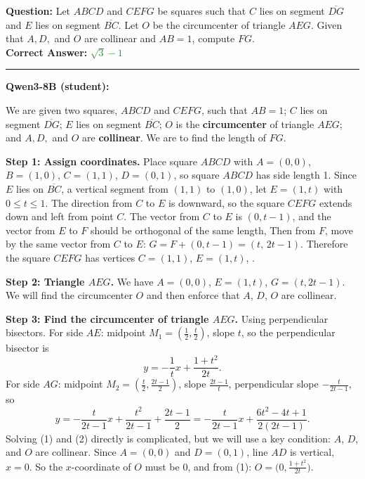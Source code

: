 \bigskip

\begin{ReasoningBox}[title={Case Study: Math Reasoning (Smaller \& Larger Setting)}, breakable]
\textbf{Question:} Let $ABCD$ and $CEFG$ be squares such that $C$ lies on segment $\overline{DG}$ and $E$ lies on segment $\overline{BC}$. Let $O$ be the circumcenter of triangle $AEG$. Given that $A, D,$ and $O$ are collinear and $AB = 1$, compute $FG$.\\
\textbf{Correct Answer:} \textcolor{forestgreen}{$\sqrt{3}-1$}

\medskip
\noindent\rule{\linewidth}{0.4pt}
\medskip

\textbf{Qwen3-8B (student):}

We are given two squares, $ABCD$ and $CEFG$, such that $AB = 1$; $C$ lies on segment $\overline{DG}$; $E$ lies on segment $\overline{BC}$; $O$ is the \textbf{circumcenter} of triangle $AEG$; and $A, D,$ and $O$ are \textbf{collinear}. We are to find the length of $FG$.

\textbf{Step 1: Assign coordinates.} Place square $ABCD$ with $A = (0,0)$, $B = (1,0)$, $C = (1,1)$, $D = (0,1)$, so square $ABCD$ has side length 1. Since $E$ lies on $\overline{BC}$, a vertical segment from $(1,1)$ to $(1,0)$, let $E = (1, t)$ with $0 \le t \le 1$. The direction from $C$ to $E$ is downward, so the square $CEFG$ extends down and left from point $C$. The vector from $C$ to $E$ is $(0, t-1)$, and the vector from $E$ to $F$ should be orthogonal of the same length,  Then from $F$, move by the same vector from $C$ to $E$: $G = F + (0, t-1) = (t,\, 2t-1)$. Therefore the square $CEFG$ has vertices $C = (1,1)$, $E = (1,t)$, .

\textbf{Step 2: Triangle $AEG$.} We have $A = (0,0)$, $E = (1,t)$, $G = (t, 2t-1)$. We will find the circumcenter $O$ and then enforce that $A$, $D$, $O$ are collinear.

\textbf{Step 3: Find the circumcenter of triangle $AEG$.} Using perpendicular bisectors. For side $AE$: midpoint $M_1 = (\tfrac12, \tfrac t2)$, slope $t$, so the perpendicular bisector is
\[
y = -\frac{1}{t}x + \frac{1 + t^2}{2t}. \tag{1}
\]
For side $AG$: midpoint $M_2 = (\tfrac t2, \tfrac{2t-1}{2})$, slope $\tfrac{2t-1}{t}$, perpendicular slope $-\tfrac{t}{2t-1}$, so
\[
y = -\frac{t}{2t-1}x + \frac{t^2}{2t-1} + \frac{2t-1}{2} = -\frac{t}{2t-1}x + \frac{6t^2 - 4t + 1}{2(2t-1)}. \tag{2}
\]
Solving (1) and (2) directly is complicated, but we will use a key condition: $A$, $D$, and $O$ are collinear. Since $A = (0,0)$ and $D = (0,1)$, line $AD$ is vertical, \ie $x = 0$. So the $x$-coordinate of $O$ must be 0, and from (1): $O = \big(0, \frac{1+t^2}{2t}\big)$.


\end{ReasoningBox}
